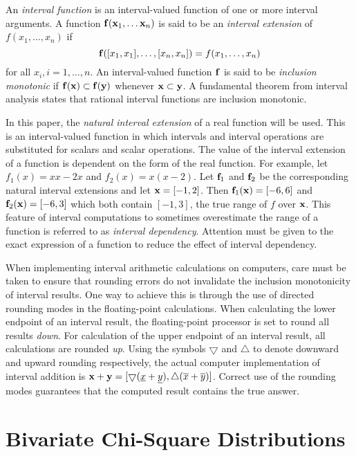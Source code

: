 An {\it interval function} is an interval-valued function of one or more
interval arguments.
A function ${\bf f}({\bf x}_1, \ldots {\bf x}_n)$ is said to be an
{\it interval extension} of $f(x_1, \ldots, x_n)$ if 
$${\bf f}([x_1,x_1], \ldots, [x_n,x_n]) = f(x_1, \ldots, x_n)$$
for all $x_i, i=1,\ldots,n$.
An interval-valued function ${\bf f}$ is said to be 
{\it inclusion monotonic} if 
${\bf f(x) \subset f(y)}$ whenever ${\bf x \subset y}$.
A fundamental theorem from interval analysis states that rational interval
functions are inclusion monotonic.

In this paper, the {\it natural interval extension} of a real function 
will be used.  This is an interval-valued function
in which intervals and interval operations 
are substituted for scalars and scalar operations.
The value of the interval extension of 
a function
is dependent on the form of the real function.  For example,
let $f_1 (x) = xx - 2x$ and 
$f_2 (x) = x(x-2)$.
Let ${\bf f}_1$ and ${\bf f}_2$ be the corresponding natural interval
extensions and let ${\bf x} = [-1,2]$.  Then
${\bf f}_1({\bf x}) = [-6, 6]$ and
${\bf f}_2({\bf x}) = [-6, 3]$
which both contain $[-1, 3]$, the true range of $f$ over ${\bf x}$.
This feature of interval computations to sometimes
overestimate the range of a function
is referred to as {\it interval dependency}.  Attention must be given to the
exact expression of a function to reduce the effect of interval dependency.

When implementing interval arithmetic calculations on computers, care must
be taken to ensure that rounding errors do not invalidate the 
inclusion monotonicity
of interval results.  One way to achieve this is through the
use of directed rounding modes in the floating-point calculations.  When 
calculating the lower endpoint of an interval result, the floating-point
processor is set to round all results {\it down}. For calculation of the
upper endpoint of an interval result, all calculations are rounded
{\it up}.  Using the symbols $\bigtriangledown$ and $\bigtriangleup$ to denote 
downward and upward rounding 
respectively, the actual computer implementation of interval addition is
$
{\bf x} + {\bf y} = 
[\bigtriangledown (\underline{x}+\underline{y}),
\bigtriangleup(\overline{x} + \overline{y})]
$.
Correct use of the rounding modes guarantees that the computed
result contains the true answer.

\section{Bivariate Chi-Square Distributions}


